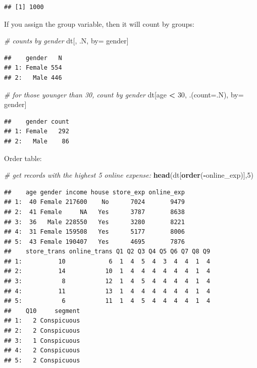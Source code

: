 \documentclass[12pt,]{krantz}
\newenvironment{Shaded}{\begin{snugshade}}{\end{snugshade}}
\newcommand{\KeywordTok}[1]{\textcolor[rgb]{0.13,0.29,0.53}{\textbf{#1}}}
\newcommand{\DataTypeTok}[1]{\textcolor[rgb]{0.13,0.29,0.53}{#1}}
\newcommand{\DecValTok}[1]{\textcolor[rgb]{0.00,0.00,0.81}{#1}}
\newcommand{\StringTok}[1]{\textcolor[rgb]{0.31,0.60,0.02}{#1}}
\newcommand{\CommentTok}[1]{\textcolor[rgb]{0.56,0.35,0.01}{\textit{#1}}}
\newcommand{\OperatorTok}[1]{\textcolor[rgb]{0.81,0.36,0.00}{\textbf{#1}}}
\newcommand{\NormalTok}[1]{#1}
\theoremstyle{definition}
\theoremstyle{definition}
\theoremstyle{definition}
\theoremstyle{remark}
\begin{document}
\begin{verbatim}
## [1] 1000
\end{verbatim}

If you assign the group variable, then it will count by groups:

\begin{Shaded}
\begin{Highlighting}[]
\CommentTok{# counts by gender}
\NormalTok{dt[, .N, by=}\StringTok{ }\NormalTok{gender]  }
\end{Highlighting}
\end{Shaded}

\begin{verbatim}
##    gender   N
## 1: Female 554
## 2:   Male 446
\end{verbatim}

\begin{Shaded}
\begin{Highlighting}[]
\CommentTok{# for those younger than 30, count by gender}
\NormalTok{ dt[age }\OperatorTok{<}\StringTok{ }\DecValTok{30}\NormalTok{, .(}\DataTypeTok{count=}\NormalTok{.N), by=}\StringTok{ }\NormalTok{gender] }
\end{Highlighting}
\end{Shaded}

\begin{verbatim}
##    gender count
## 1: Female   292
## 2:   Male    86
\end{verbatim}

Order table:

\begin{Shaded}
\begin{Highlighting}[]
\CommentTok{# get records with the highest 5 online expense:}
\KeywordTok{head}\NormalTok{(dt[}\KeywordTok{order}\NormalTok{(}\OperatorTok{-}\NormalTok{online_exp)],}\DecValTok{5}\NormalTok{) }
\end{Highlighting}
\end{Shaded}

\begin{verbatim}
##    age gender income house store_exp online_exp
## 1:  40 Female 217600    No      7024       9479
## 2:  41 Female     NA   Yes      3787       8638
## 3:  36   Male 228550   Yes      3280       8221
## 4:  31 Female 159508   Yes      5177       8006
## 5:  43 Female 190407   Yes      4695       7876
##    store_trans online_trans Q1 Q2 Q3 Q4 Q5 Q6 Q7 Q8 Q9
## 1:          10            6  1  4  5  4  3  4  4  1  4
## 2:          14           10  1  4  4  4  4  4  4  1  4
## 3:           8           12  1  4  5  4  4  4  4  1  4
## 4:          11           13  1  4  4  4  4  4  4  1  4
## 5:           6           11  1  4  5  4  4  4  4  1  4
##    Q10     segment
## 1:   2 Conspicuous
## 2:   2 Conspicuous
## 3:   1 Conspicuous
## 4:   2 Conspicuous
## 5:   2 Conspicuous
\end{verbatim}
\end{document}
